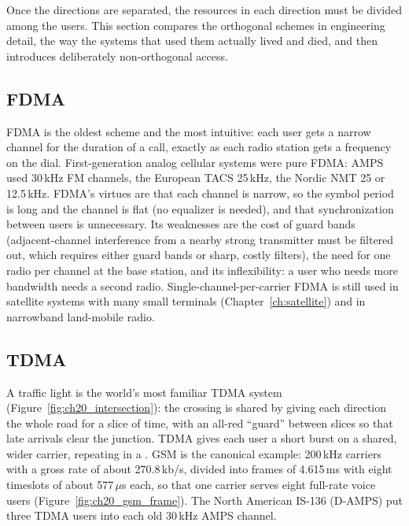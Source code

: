 Once the directions are separated, the resources in each direction must be divided among the
users. This section compares the orthogonal schemes in engineering detail, the way the systems
that used them actually lived and died, and then introduces deliberately non-orthogonal access.



\subsection{FDMA}

FDMA is the oldest scheme and the most intuitive: each user gets a narrow channel for the
duration of a call, exactly as each radio station gets a frequency on the dial. First-generation
analog cellular systems were pure FDMA: AMPS used 30\,kHz FM channels, the European TACS 25\,kHz,
the Nordic NMT 25 or 12.5\,kHz. FDMA's virtues are that each channel is narrow, so the symbol period
is long and the channel is flat (no equalizer is needed), and that synchronization between users
is unnecessary. Its weaknesses are the cost of guard bands (adjacent-channel interference from a
nearby strong transmitter must be filtered out, which requires either guard bands or sharp, costly
filters), the need for one radio per channel at the base station, and its inflexibility: a user
who needs more bandwidth needs a second radio. Single-channel-per-carrier FDMA is still used in
satellite systems with many small terminals (Chapter~\ref{ch:satellite}) and in narrowband
land-mobile radio.

\subsection{TDMA}

A traffic light is the world's most familiar TDMA system (Figure~\ref{fig:ch20_intersection}): the
crossing is shared by giving each direction the whole road for a slice of time, with an all-red
``guard'' between slices so that late arrivals clear the junction. TDMA gives each user a short burst
on a shared, wider carrier, repeating in a . GSM is the canonical example: 200\,kHz carriers
with a gross rate of about 270.8\,kb/s, divided into frames of 4.615\,ms with eight timeslots of about
577\,$\mu$s each, so that one carrier serves eight full-rate voice users (Figure~\ref{fig:ch20_gsm_frame}).
The North American IS-136 (D-AMPS) put three TDMA users into each old 30\,kHz AMPS channel.


